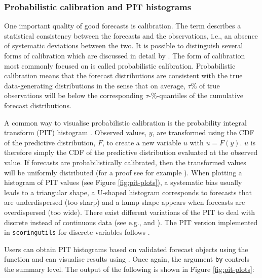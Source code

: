 \documentclass[
]{jss}
\begin{document}
\subsubsection{Probabilistic calibration and PIT
histograms}\label{probabilistic-calibration-and-pit-histograms}

One important quality of good forecasts is calibration. The term
describes a statistical consistency between the forecasts and the
observations, i.e., an absence of systematic deviations between the two.
It is possible to distinguish several forms of calibration which are
discussed in detail by
\cite{gneitingProbabilisticForecastsCalibration2007}. The form of
calibration most commonly focused on is called probabilistic
calibration. Probabilistic calibration means that the forecast
distributions are consistent with the true data-generating distributions
in the sense that on average, \(\tau\)\% of true observations will be
below the corresponding \(\tau\)-\%-quantiles of the cumulative forecast
distributions.

A common way to visualise probabilistic calibration is the probability
integral transform (PIT) histogram
\citep{dawidPresentPositionPotential1984}. Observed values, \(y\), are
transformed using the CDF of the predictive distribution, \(F\), to
create a new variable \(u\) with \(u = F(y)\). \(u\) is therefore simply
the CDF of the predictive distribution evaluated at the observed value.
If forecasts are probabilistically calibrated, then the transformed
values will be uniformly distributed (for a proof see for example
\citet{angusProbabilityIntegralTransform1994}). When plotting a
histogram of PIT values (see Figure \ref{fig:pit-plots}), a systematic
bias usually leads to a triangular shape, a U-shaped histogram
corresponds to forecasts that are underdispersed (too sharp) and a hump
shape appears when forecasts are overdispersed (too wide). There exist
different variations of the PIT to deal with discrete instead of
continuous data (see e.g., \cite{czadoPredictiveModelAssessment2009} and
\cite{funkAssessingPerformanceRealtime2019}). The PIT version
implemented in \texttt{scoringutils} for discrete variables follows
\cite{funkAssessingPerformanceRealtime2019}.

Users can obtain PIT histograms based on validated forecast objects
using the function  and can visualise results using
. Once again, the argument \texttt{by} controls the
summary level. The output of the following is shown in Figure
\ref{fig:pit-plots}:
\end{document}
